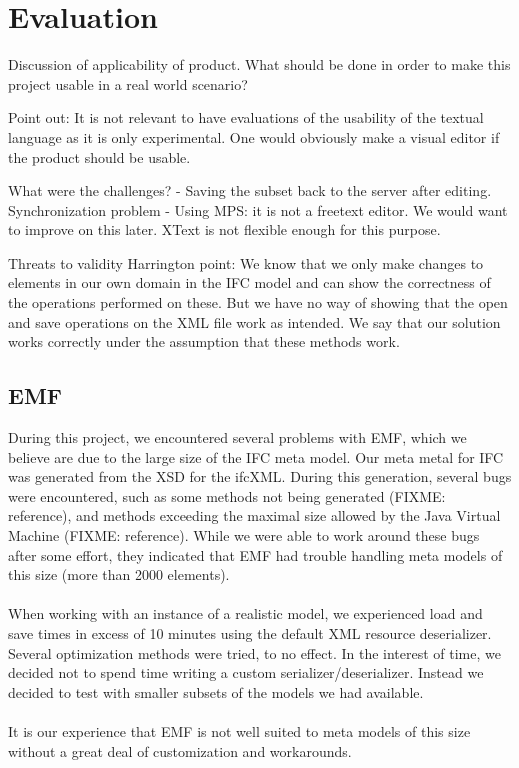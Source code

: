 \section{Evaluation}
Discussion of applicability of product. What should be done in order to make this project usable in a real world scenario?

Point out: It is not relevant to have evaluations of the usability of the textual language as it is only experimental. One would obviously make a visual editor if the product should be usable.

What were the challenges?
- Saving the subset back to the server after editing. Synchronization problem
- Using MPS: it is not a freetext editor. We would want to improve on this later. XText is not flexible enough for this purpose.



Threats to validity
Harrington point: We know that we only make changes to elements in our own domain in the IFC model and can show the correctness of the operations performed on these. But we have no way of showing that the open and save operations on the XML file work as intended. We say that our solution works correctly under the assumption that these methods work.

\subsection{EMF}
\label{Evaluation_EMF}
During this project, we encountered several problems with EMF, which we believe are due to the large size of the IFC meta model. Our meta metal for IFC was generated from the XSD for the ifcXML. During this generation, several bugs were encountered, such as some methods not being generated (FIXME: reference), and methods exceeding the maximal size allowed by the Java Virtual Machine (FIXME: reference). While we were able to work around these bugs after some effort, they indicated that EMF had trouble handling meta models of this size (more than 2000 elements).
\paragraph{}
When working with an instance of a realistic model, we experienced load and save times in excess of 10 minutes using the default XML resource deserializer. Several optimization methods were tried\cite{emfperformancetips, emfperformanceandextensibility}, to no effect. In the interest of time, we decided not to spend time writing a custom serializer/deserializer. Instead we decided to test with smaller subsets of the models we had available.
\paragraph{}
It is our experience that EMF is not well suited to meta models of this size without a great deal of customization and workarounds. %